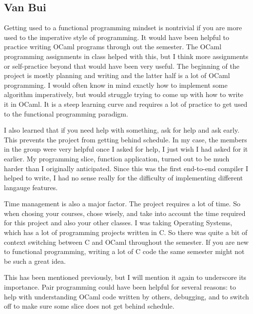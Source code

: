 \subsection{Van Bui}

Getting used to a functional programming mindset is nontrivial if you are more used to the imperative style of programming. It would have been helpful to practice writing OCaml programs through out the semester. The OCaml programming assignments in class helped with this, but I think more assignments or self-practice beyond that would have been very useful. The beginning of the project is mostly planning and writing and the latter half is a lot of OCaml programming. I would often know in mind exactly how to implement some algorithm imperatively, but would struggle trying to come up with how to write it in OCaml. It is a steep learning curve and requires a lot of practice to get used to the functional programming paradigm.   

I also learned that if you need help with something, ask for help and ask early. This prevents the project from getting behind schedule. In my case, the members in the group were very helpful once I asked for help, I just wish I had asked for it earlier. My programming slice, function application, turned out to be much harder than I originally anticipated. Since this was the first end-to-end compiler I helped to write, I had no sense really for the difficulty of implementing different langauge features.

Time management is also a major factor. The project requires a lot of time. So when chosing your courses, chose wisely, and take into account the time required for this project and also your other classes. I was taking Operating Systems, which has a lot of programming projects written in C. So there was quite a bit of context switching between C and OCaml throughout the semester. If you are new to functional programming, writing a lot of C code the same semester might not be such a great idea.

This has been mentioned previously, but I will mention it again to underscore its importance. Pair programming could have been helpful for several reasons: to help with understanding OCaml code written by others, debugging, and to switch off to make sure some slice does not get behind schedule.      

